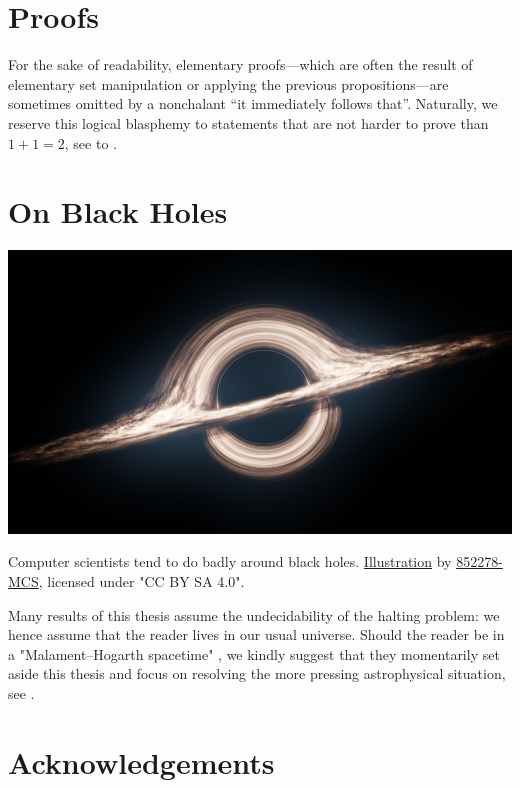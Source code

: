 \section*{Proofs}

For the sake of readability, elementary
proofs---which are often the result of elementary set manipulation or applying
the previous propositions---are sometimes omitted by a nonchalant
``it immediately follows that''.
Naturally, we reserve this logical blasphemy to
statements that are not harder to prove than $1+1 = 2$,
see \cite[$\ast$ 54.43]{WhiteheadRussell1910PM1} to \cite[$\ast$ 110.643]{WhiteheadRussell1912PM2}.

\section*{On Black Holes}

\begin{marginfigure}
	\centering
	\includegraphics[width=\linewidth]{fig/intro/black-hole.png}
	\caption{
		\AP\label{fig:preface-black-hole}
		Computer scientists tend to do badly around black holes.
		\href{https://commons.wikimedia.org/wiki/File:Black_Hole_Full.png}{Illustration}
		by \href{https://commons.wikimedia.org/wiki/User:852278-MCS}{852278-MCS},
		licensed under "CC BY SA 4.0".
	}
\end{marginfigure}
Many results of this thesis assume the undecidability of the halting problem:
we hence assume that the reader lives in our usual universe.
Should the reader be in a "Malament–Hogarth spacetime" \cite{Hogarth1994NonTuring},
we kindly suggest that
they momentarily set aside this thesis and focus on resolving the more pressing
astrophysical situation, see .

\section*{Acknowledgements}

